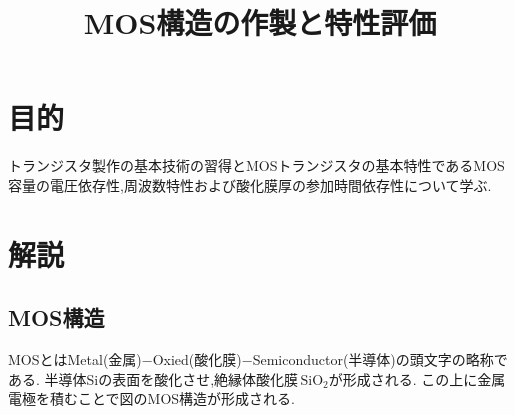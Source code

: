 \documentclass[11pt]{jarticle}
\title{MOS構造の作製と特性評価}
\begin{document}
\maketitle

\section{目的}
	トランジスタ製作の基本技術の習得とMOSトランジスタの基本特性であるMOS容量の電圧依存性,周波数特性および酸化膜厚の参加時間依存性について学ぶ.

\section{解説}
	\subsection{MOS構造}
		MOSとはMetal(金属)−Oxied(酸化膜)−Semiconductor(半導体)の頭文字の略称である.
		半導体Siの表面を酸化させ,絶縁体酸化膜\,$\mathrm{SiO_{2}}$が形成される.
		この上に金属電極を積むことで図のMOS構造が形成される.
\end{document}
